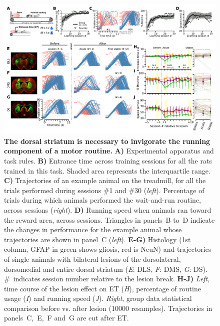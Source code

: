 \begin{figure}[bth!]
	\begin{center}
		\includegraphics[width=\textwidth]{ch-lesion/figures/Task_Example_Group.pdf}
		\caption
		{\textbf{The dorsal striatum is necessary to invigorate the running component of a motor routine.}
		\textbf{A)} Experimental apparatus and task rules.
		\textbf{B)} Entrance time across training sessions for all the rats trained in this task.  
		Shaded area represents the interquartile range.
		\textbf{C)} Trajectories of an example animal on the treadmill, for all the trials performed during sessions \#1 and \#30 (\textit{left}).
		Percentage of trials during which animals performed the wait-and-run routine, across sessions (\textit{right}).
		\textbf{D)} Running speed when animals ran toward the reward area, across sessions.
		Triangles in panels~B to~D indicate the changes in performance for the example animal whose trajectories are shown in panel~C (\textit{left}).
		\textbf{E-G)} Histology (1st column, GFAP in green shows gliosis, red is NeuN) and trajectories of single animals with bilateral lesions of the dorsolateral, dorsomedial and entire dorsal striatum (\textit{E}: DLS, \textit{F}: DMS, \textit{G}: DS).
		\#~indicates session number relative to the lesion break.
		\textbf{H-J)} \textit{Left}, time course of the lesion effect on ET (\textit{H}), percentage of routine usage (\textit{I}) and running speed (\textit{J}).
		\textit{Right}, group data statistical comparison before vs. after lesion (10000 resamples).
		Trajectories in panels~C,~E,~F and~G are cut after ET.
		}
		\label{fig:lesion:task}
	\end{center}
\end{figure}